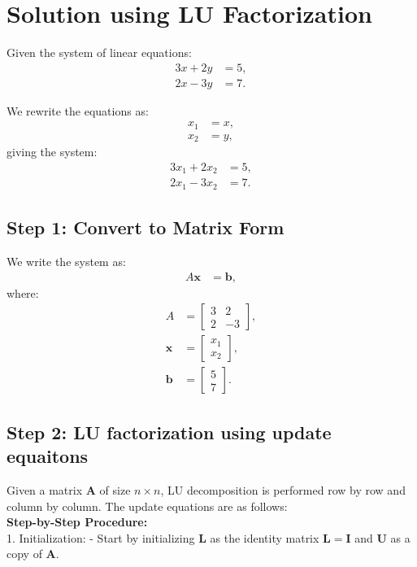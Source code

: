 \documentclass[journal]{IEEEtran}
\begin{document}
	\section*{Solution using LU Factorization}
	
	Given the system of linear equations:
	\begin{align}
		3x + 2y &= 5, \label{eq1} \\
		2x - 3y &= 7. \label{eq2}
	\end{align}
	
	We rewrite the equations as:
	\begin{align}
		x_1 &= x, \\
		x_2 &= y,
	\end{align}
	giving the system:
	\begin{align}
		3x_1 + 2x_2 &= 5, \label{eq3} \\
		2x_1 - 3x_2 &= 7. \label{eq4}
	\end{align}
	
	\subsection*{Step 1: Convert to Matrix Form}
	We write the system as:
	\begin{align}
		A \mathbf{x} &= \mathbf{b},
	\end{align}
	where:
	\begin{align}
		A &= \begin{bmatrix} 3 & 2 \\ 2 & -3 \end{bmatrix}, \\
		\mathbf{x} &= \begin{bmatrix} x_1 \\ x_2 \end{bmatrix}, \\
		\mathbf{b} &= \begin{bmatrix} 5 \\ 7 \end{bmatrix}.
	\end{align}
	\subsection*{Step 2: LU factorization using update equaitons}
	Given a matrix $ \mathbf{A} $ of size $ n \times n $, LU decomposition is performed row by row and column by column. The update equations are as follows:\\
	\textbf{Step-by-Step Procedure:}\\
	1. Initialization: 
	- Start by initializing $ \mathbf{L} $ as the identity matrix $ \mathbf{L} = \mathbf{I} $ and $ \mathbf{U} $ as a copy of $ \mathbf{A} $.
	
\end{document}
